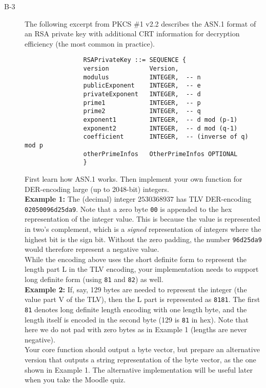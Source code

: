 \documentclass{article}
\begin{document}
\begin{description}
			\item[B-3]{The following excerpt from PKCS \#1 v2.2 describes the ASN.1 format of an RSA private key with additional CRT information for decryption efficiency (the most common in practice).
				\begin{verbatim}
				RSAPrivateKey ::= SEQUENCE {
				version           Version,
				modulus           INTEGER,  -- n
				publicExponent    INTEGER,  -- e
				privateExponent   INTEGER,  -- d
				prime1            INTEGER,  -- p
				prime2            INTEGER,  -- q
				exponent1         INTEGER,  -- d mod (p-1)
				exponent2         INTEGER,  -- d mod (q-1)
				coefficient       INTEGER,  -- (inverse of q) mod p
				otherPrimeInfos   OtherPrimeInfos OPTIONAL
				}
				\end{verbatim}
				First learn how ASN.1 works. Then implement your own function for DER-encoding large (up to 2048-bit) integers.\\
				
				\textbf{Example 1:} The (decimal) integer $2530368937$ has TLV DER-encoding \verb!02050096d25da9!. Note that a zero byte \verb!00! is appended to the hex representation of the integer value. This is because the value is represented in two's complement, which is a \textit{signed} representation of integers where the highest bit is the sign bit. Without the zero padding, the number \verb!96d25da9! would therefore represent a negative value.\\
				
				While the encoding above uses the short definite form to represent the length part L in the TLV encoding, your implementation needs to support long definite form (using \verb!81! and \verb!82!) as well.\\
				
				\textbf{Example 2:} If, say, 129 bytes are needed to represent the integer (the value part V of the TLV), then the L part is represented as \verb!8181!. The first \verb!81! denotes long definite length encoding with one length byte, and the length itself is encoded in the second byte (129 is \verb!81! in hex). Note that here we do not pad with zero bytes as in Example 1 (lengths are never negative).\\
				
				Your core function should output a byte vector, but prepare an alternative version that outputs a string representation of the byte vector, as the one shown in Example 1. The alternative implementation will be useful later when you take the Moodle quiz.
				
}
\end{description}
\end{document}
